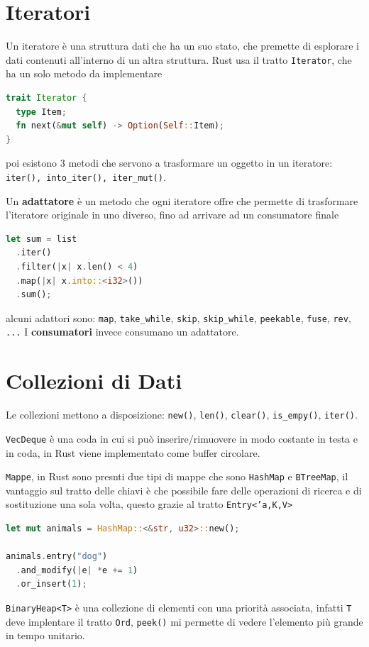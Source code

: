 \documentclass[12pt]{article}
\begin{document}
\section{Iteratori}
Un iteratore \`e una struttura dati che ha un suo stato, che premette di esplorare i dati contenuti all'interno di un altra struttura. Rust usa il tratto \texttt{Iterator}, che ha un solo metodo da implementare
\begin{lstlisting}[language=rust]
trait Iterator {
  type Item;
  fn next(&mut self) -> Option(Self::Item);
}
\end{lstlisting}
poi esistono 3 metodi che servono a trasformare un oggetto in un iteratore: \texttt{iter(), into\_iter(), iter\_mut()}.

Un \textbf{adattatore} \`e un metodo che ogni iteratore offre che permette di trasformare l'iteratore originale in uno diverso, fino ad arrivare ad un consumatore finale
\begin{lstlisting}[language=rust]
let sum = list
  .iter()
  .filter(|x| x.len() < 4)
  .map(|x| x.into::<i32>())
  .sum();
\end{lstlisting}
alcuni adattori sono: \texttt{map}, \texttt{take\_while}, \texttt{skip}, \texttt{skip\_while}, \texttt{peekable}, \texttt{fuse}, \texttt{rev}, \texttt{...} I \textbf{consumatori} invece consumano un adattatore.


\section{Collezioni di Dati}
Le collezioni mettono a disposizione: \texttt{new()}, \texttt{len()}, \texttt{clear()}, \texttt{is\_empy()}, \texttt{iter()}.

\texttt{VecDeque} \`e una coda in cui si pu\`o inserire/rimuovere in modo costante in testa e in coda, in Rust viene implementato come buffer circolare.

\texttt{Mappe}, in Rust sono presnti due tipi di mappe che sono \texttt{HashMap} e \texttt{BTreeMap}, il vantaggio sul tratto delle chiavi \`e che possibile fare delle operazioni di ricerca e di sostituzione una sola volta, questo grazie al tratto \texttt{Entry<'a,K,V>}
\begin{lstlisting}[language=rust]
let mut animals = HashMap::<&str, u32>::new();

animals.entry("dog")
  .and_modify(|e| *e += 1)
  .or_insert(1);
\end{lstlisting}

\texttt{BinaryHeap<T>} \`e una collezione di elementi con una priorit\`a associata, infatti \texttt{T} deve implentare il tratto \texttt{Ord}, \texttt{peek()} mi permette di vedere l'elemento pi\`u grande in tempo unitario.
\end{document}
